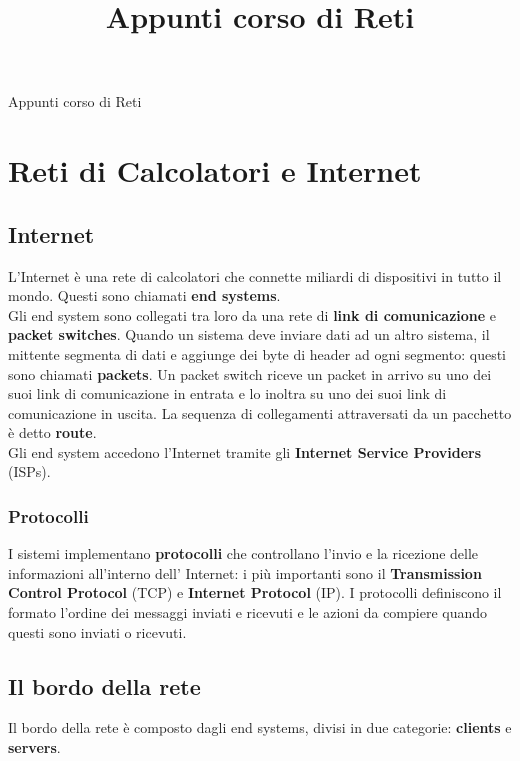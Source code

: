 \documentclass[11pt]{article}
\title{Appunti corso di Reti}
\begin{document}
\begin{center}
    \Huge{Appunti corso di Reti}
\end{center}
\section{Reti di Calcolatori e Internet}
\subsection{Internet}
L'Internet è una rete di calcolatori che connette miliardi di dispositivi in tutto il mondo. Questi sono chiamati 
\textbf{end systems}.\\
Gli end system sono collegati tra loro da una rete di \textbf{link di comunicazione} e
\textbf{packet switches}. Quando un sistema deve inviare dati ad un altro sistema, il mittente segmenta di dati e
aggiunge dei byte di header ad ogni segmento: questi sono chiamati \textbf{packets}. Un packet switch riceve un packet
in arrivo su uno dei suoi link di comunicazione in entrata e lo inoltra su uno dei suoi link di comunicazione in uscita.
La sequenza di collegamenti attraversati da un pacchetto è detto \textbf{route}.\\
Gli end system accedono l'Internet tramite gli \textbf{Internet Service Providers} (ISPs).
\subsubsection{Protocolli}
I sistemi implementano \textbf{protocolli} che controllano l'invio e la ricezione delle informazioni all'interno dell'
Internet: i più importanti sono il \textbf{Transmission Control Protocol} (TCP) e \textbf{Internet Protocol} (IP).
I protocolli definiscono il formato l'ordine dei messaggi inviati e ricevuti e le azioni da compiere quando questi sono
inviati o ricevuti.
\subsection{Il bordo della rete}
Il bordo della rete è composto dagli end systems, divisi in due categorie: \textbf{clients} e \textbf{servers}.\\
\end{document}
